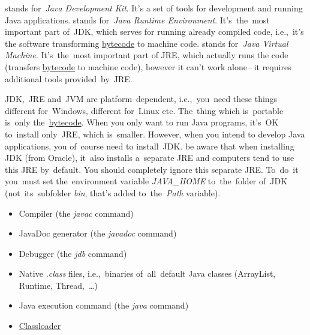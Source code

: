 \label{jdkjrejvm}
\begin{itemize}
     stands for~\textit{Java Development Kit}.
            It's a set of tools for development and running Java applications.
     stands for~\textit{Java Runtime Environment}.
            It's~the~most important part of~JDK, which serves for running already compiled code, i.e.,~it's the software transforming \hyperref[bytecode]{bytecode} to machine code.
     stands for~\textit{Java Virtual Machine}.
            It's~the~most important part of JRE, which actually runs the code (transfers \hyperref[bytecode]{bytecode} to machine code), however it can't work alone\,--\,it requires additional tools provided~by~JRE\@.
\end{itemize}

\noindent JDK,~JRE and~JVM are platform--dependent, i.e.,~you~need these things different for~Windows, different for~Linux etc.
The~thing which is~portable is~only the~\hyperref[bytecode]{bytecode}.
When you only want to run Java programs, it's~OK to~install only~JRE, which is~smaller.
However, when you intend to develop Java applications, you of~course need to install~JDK\@.
be aware that when installing JDK (from Oracle), it~also installs a~separate JRE and computers tend to use this JRE by~default.
You should completely ignore this separate JRE\@.
To~do~it you~must set the~environment variable \textit{JAVA\_HOME} to~the~folder of~JDK (not~its~subfolder \textit{bin}, that's added to~the~\textit{Path} variable).

\begin{itemize}
    \item Compiler (the \textit{javac} command)
    \item JavaDoc generator (the \textit{javadoc} command)
    \item Debugger (the \textit{jdb} command)
\end{itemize}

\begin{itemize}
    \item Native \textit{.class} files, i.e.,~binaries of~all~default Java classes (ArrayList, Runtime, Thread,~\dots)
    \item Java execution command (the \textit{java} command)
    \item \hyperref[classloaders]{Classloader}
\end{itemize}
